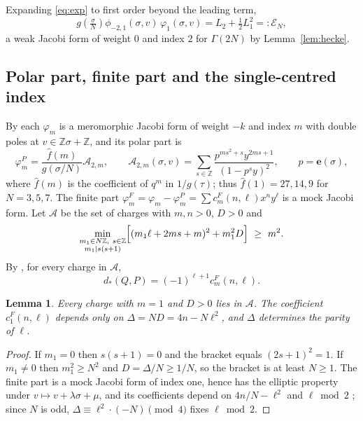 \documentclass[mathematics,article,submit,pdftex,oneauthor]{Definitions/mdpi}
\numberwithin{equation}{section}
\theoremstyle{plain}
\newtheorem{lem}[thm]{Lemma}
\theoremstyle{remark}
\newcommand{\Z}{\mathbb{Z}}
\newcommand{\cA}{\mathcal{A}}
\newcommand{\cE}{\mathcal{E}}
\newcommand{\e}{\mathbf{e}}
\newcommand{\pmi}{\phi_{-2,1}}
\begin{document}
Expanding \eqref{eq:exp} to first order beyond the leading term,
\begin{equation}\label{eq:numerator}
g\!\left(\tfrac\sigma N\right)\pmi(\sigma,v)\,\varphi_1(\sigma,v)=L_2+\tfrac12L_1^2=:\cE_N,
\end{equation}
a weak Jacobi form of weight $0$ and index $2$ for $\Gamma(2N)$ by Lemma~\ref{lem:hecke}.

\subsection{Polar part, finite part and the single-centred index}
By \cite[Theorem~5.2]{BSS25} each $\varphi_m$ is a meromorphic Jacobi form of weight $-k$ and index $m$ with double poles at $v\in\Z\sigma+\Z$, and its polar part is \cite[(5.45)]{BSS25}
\begin{equation}\label{eq:polar}
\varphi^P_m=\frac{\hat f(m)}{g(\sigma/N)}\cA_{2,m},\qquad \cA_{2,m}(\sigma,v)=\sum_{s\in\Z}\frac{p^{ms^2+s}y^{2ms+1}}{(1-p^sy)^2},\qquad p=\e(\sigma),
\end{equation}
where $\hat f(m)$ is the coefficient of $q^m$ in $1/g(\tau)$; thus $\hat f(1)=27,14,9$ for $N=3,5,7$. The finite part $\varphi^F_m=\varphi_m-\varphi^P_m=\sum c^F_m(n,\ell)x^ny^\ell$ is a mock Jacobi form. Let $\cA$ be the set of charges with $m,n>0$, $D>0$ and
\begin{equation}\label{eq:setA}
\min_{\substack{m_1\in N\Z,\ s\in\Z\\ m_1\mid s(s+1)}}\Bigl[(m_1\ell+2ms+m)^2+m_1^2D\Bigr]\ \ge\ m^2.
\end{equation}
By \cite[Theorem~5.4(a) and (5.57)]{BSS25}, for every charge in $\cA$,
\begin{equation}\label{eq:dstar}
d_*(Q,P)=(-1)^{\ell+1}c^F_m(n,\ell).
\end{equation}

\begin{lem}\label{lem:first}
Every charge with $m=1$ and $D>0$ lies in $\cA$. The coefficient $c^F_1(n,\ell)$ depends only on $\Delta=ND=4n-N\ell^2$, and $\Delta$ determines the parity of $\ell$.
\end{lem}

\begin{proof}
If $m_1=0$ then $s(s+1)=0$ and the bracket equals $(2s+1)^2=1$. If $m_1\ne0$ then $m_1^2\ge N^2$ and $D=\Delta/N\ge1/N$, so the bracket is at least $N\ge1$. The finite part is a mock Jacobi form of index one, hence has the elliptic property under $v\mapsto v+\lambda\sigma+\mu$, and its coefficients depend on $4n/N-\ell^2$ and $\ell\bmod2$ \cite[\S2]{EZ85}; since $N$ is odd, $\Delta\equiv\ell^2\cdot(-N)\pmod4$ fixes $\ell\bmod2$.
\end{proof}
\end{document}
